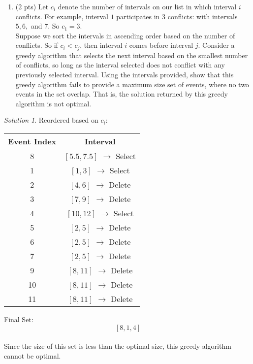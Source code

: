 \documentclass[12pt]{article}
\theoremstyle{remark}
\newtheorem*{solution}{Solution}
\begin{document}
\begin{enumerate}
\begin{enumerate}[label=(\alph*)]
\newpage
\item (2 pts) Let $c_{i}$ denote the number of intervals on our list in which interval $i$ conflicts. For example, interval $1$ participates in $3$ conflicts: with intervals $5, 6,$ and $7$. So $c_{1} = 3$. \\

\noindent Suppose we sort the intervals in ascending order based on the number of conflicts. So if $c_{i} < c_{j}$, then interval $i$ comes before interval $j$. Consider a greedy algorithm that selects the next interval based on the smallest number of conflicts, so long as the interval selected does not conflict with any previously selected interval. Using the intervals provided, show that this greedy algorithm fails to provide a maximum size set of events, where no two events in the set overlap. That is, the solution returned by this greedy algorithm is not optimal.
\end{enumerate}

\begin{solution}
Reordered based on $c_i$:
\begin{center}
\begin{tabular}{c|c}
Event Index & Interval \\ \hline
8 & $[5.5, 7.5]$ $\rightarrow$ Select\\
1 & $[1, 3]$ $\rightarrow$ Select\\ 
2 & $[4, 6]$ $\rightarrow$ Delete\\
3 & $[7, 9]$ $\rightarrow$ Delete\\
4 & $[10, 12]$ $\rightarrow$ Select\\ 
5 & $[2, 5]$ $\rightarrow$ Delete\\
6 & $[2, 5]$ $\rightarrow$ Delete\\
7 & $[2, 5]$ $\rightarrow$ Delete\\
9 & $[8, 11]$ $\rightarrow$ Delete\\
10 & $[8, 11]$ $\rightarrow$ Delete\\
11 & $[8, 11]$ $\rightarrow$ Delete\\
\end{tabular}
\end{center}
Final Set: $$[8,1,4]$$ \\
Since the size of this set is less than the optimal size, this greedy algorithm cannot be optimal.
\end{solution}


\end{enumerate}
\end{document}
